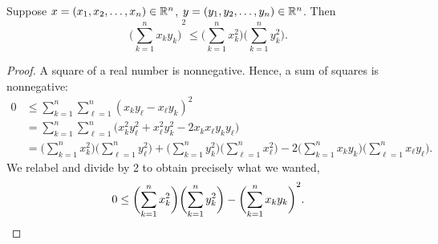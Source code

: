 \begin{lemma}
Suppose $x =(x_1,x_2,\ldots,x_n) \in {\mathbb{R}}^n$, $y =(y_1,y_2,\ldots,y_n) \in {\mathbb{R}}^n$.
Then
\begin{equation*}
{\biggl( \sum_{k=1}^n x_k y_k \biggr)}^2
\leq
\biggl(\sum_{k=1}^n x_k^2 \biggr)
\biggl(\sum_{k=1}^n y_k^2 \biggr) .
\end{equation*}
\end{lemma}

\begin{proof}
A square of a real number is nonnegative.  Hence, a sum of squares is
nonnegative:
\begin{equation*}
\begin{split}
0 & \leq 
\sum_{k=1}^n \sum_{\ell=1}^n {(x_k y_\ell - x_\ell y_k)}^2
\\
& =
\sum_{k=1}^n \sum_{\ell=1}^n \bigl( x_k^2 y_\ell^2 + x_\ell^2 y_k^2 - 2 x_k
x_\ell y_k
y_\ell \bigr)
\\
& =
\biggl( \sum_{k=1}^n x_k^2 \biggr)
\biggl( \sum_{\ell=1}^n y_\ell^2 \biggr)
+
\biggl( \sum_{k=1}^n y_k^2 \biggr)
\biggl( \sum_{\ell=1}^n x_\ell^2 \biggr)
-
2
\biggl( \sum_{k=1}^n x_k y_k \biggr)
\biggl( \sum_{\ell=1}^n x_\ell y_\ell \biggr) .
\end{split}
\end{equation*}
We relabel and divide by 2 to obtain precisely what we wanted,
\begin{equation*}
0 \leq 
\biggl( \sum_{k=1}^n x_k^2 \biggr)
\biggl( \sum_{k=1}^n y_k^2 \biggr)
-
{\biggl( \sum_{k=1}^n x_k y_k \biggr)}^2 .
\qedhere
\end{equation*}
\end{proof}

